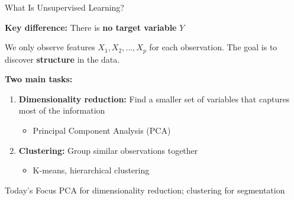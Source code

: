 \documentclass[10pt]{beamer}
\newcommand{\highlight}[1]{\textcolor{AccentOrange}{\textbf{#1}}}
\begin{document}

\begin{frame}{What Is Unsupervised Learning?}

  \textbf{Key difference:} There is \highlight{no target variable} $Y$

  \vspace{1em}
  We only observe features $X_1, X_2, \ldots, X_p$ for each observation. The goal is to discover \highlight{structure} in the data.

  \vspace{1em}
  \textbf{Two main tasks:}
  \begin{enumerate}
    \item \textbf{Dimensionality reduction:} Find a smaller set of variables that captures most of the information
    \begin{itemize}
      \item Principal Component Analysis (PCA)
    \end{itemize}

    \vspace{0.5em}
    \item \textbf{Clustering:} Group similar observations together
    \begin{itemize}
      \item K-means, hierarchical clustering
    \end{itemize}
  \end{enumerate}

  \vspace{1em}
  \begin{block}{Today's Focus}
    PCA for dimensionality reduction; clustering for segmentation
  \end{block}
\end{frame}

\end{document}
